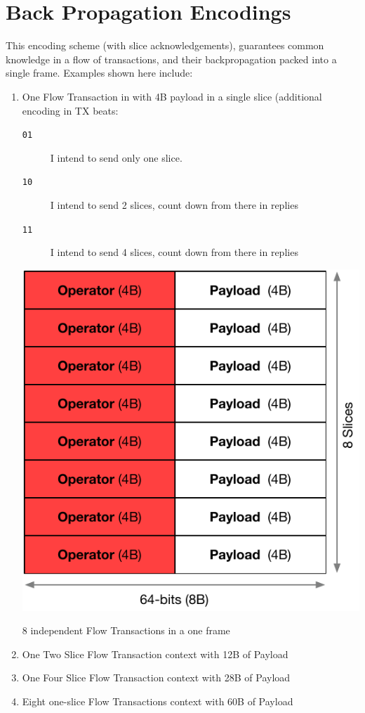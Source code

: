 \documentclass[../HFT-main.tex]{subfiles}
\begin{document}

\section{Back Propagation Encodings}

This encoding scheme (with slice acknowledgements), guarantees common knowledge in a flow of transactions, and their backpropagation packed into a single frame. Examples shown here include:


\begin{enumerate}
\item One Flow Transaction in with 4B payload in a single slice  (additional encoding in TX beats:
\begin{description} 
\item [\texttt{01}] I intend to send only one slice.
\item [\texttt{10}] I intend to send 2 slices, count down from there in replies
\item [\texttt{11}] I intend to send 4 slices, count down from there in replies
\end{description}
\begin{marginfigure}
  \includegraphics[width=\linewidth]{../figures/8-slices.pdf}
  \caption{8 independent Flow Transactions in a one frame}
\end{marginfigure}
\item One Two Slice  Flow Transaction context with 12B of Payload
\item One Four Slice  Flow Transaction context with 28B of Payload
\item Eight one-slice Flow Transactions context with 60B of Payload
\end{enumerate}
\end{document}
